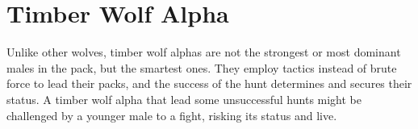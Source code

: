 \section{Timber Wolf Alpha}

Unlike other wolves, timber wolf alphas are not the strongest or most dominant males in the pack, but the smartest ones. They employ tactics instead of brute force to lead their packs, and the success of the hunt determines and secures their status. A timber wolf alpha that lead some unsuccessful hunts might be challenged by a younger male to a fight, risking its status and live.